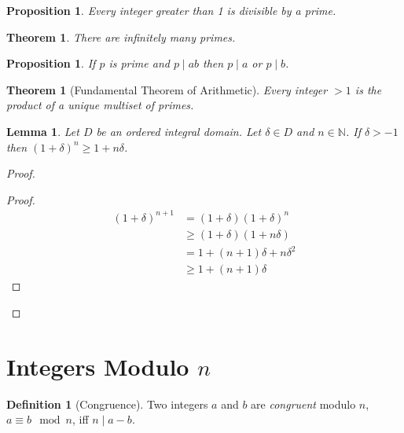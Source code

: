 \documentclass{article}
\let\qed\relax
\newtheorem{lemma}[axiom]{Lemma}
\newtheorem{proposition}[axiom]{Proposition}
\newtheorem{theorem}[axiom]{Theorem}
\theoremstyle{definition}
\newtheorem{definition}[axiom]{Definition}
\begin{document}
    \begin{proposition}
        Every integer greater than 1 is divisible by a prime.
    \end{proposition}

    \begin{theorem}
        There are infinitely many primes.
    \end{theorem}

    \begin{proposition}
        If $p$ is prime and $p \mid ab$ then $p \mid a$ or $p \mid b$.
    \end{proposition}

    \begin{theorem}[Fundamental Theorem of Arithmetic]
        Every integer $> 1$ is the product of a unique multiset of primes.
    \end{theorem}

    \begin{lemma}
        \label{lemma:pre_binomial}
        Let $D$ be an ordered integral domain. Let $\delta \in D$ and $n \in \mathbb{N}$. If $\delta > -1$ then $(1+\delta)^n \geq
        1 + n \delta$.
    \end{lemma}

    \begin{proof}
        \pf
        \begin{proof}
            \pf
            \begin{align*}
                (1+\delta)^{n+1} & = (1+\delta)(1 + \delta)^n \\
                & \geq (1+\delta)(1 + n \delta) \\
                & = 1 + (n+1)\delta + n \delta^2 \\
                & \geq 1 + (n+1)\delta
            \end{align*}
        \end{proof}
        \qed
    \end{proof}

    \section{Integers Modulo $n$}

    \begin{definition}[Congruence]
        Two integers $a$ and $b$ are \emph{congruent} modulo $n$, $a \equiv b \mod n$, iff $n \mid a - b$.
    \end{definition}
\end{document}
